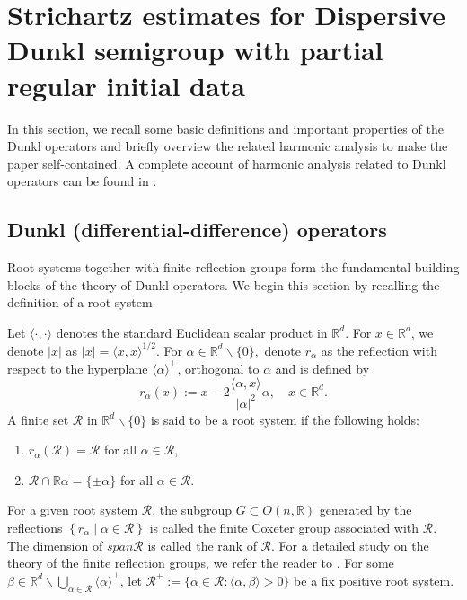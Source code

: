 \documentclass[a4paper,11pt, reqno]{amsart}
\theoremstyle{definition}
\theoremstyle{remark}
\numberwithin{equation}{section}
\begin{document}
	
	
	\section{Strichartz estimates for Dispersive Dunkl semigroup with  partial regular initial data}\label{sec5}
In this section, we recall some basic definitions and important properties of the Dunkl operators and briefly overview the related harmonic analysis to make the paper self-contained. A complete account of harmonic analysis related to Dunkl operators can be found in \cite{ros, ben, Ratna3, Mejjaoli2009, MS, Jiu-Li, FMSW}.  
	\subsection{Dunkl (differential-difference) operators}\label{dunklop} Root systems together with finite reflection groups form the fundamental building blocks of the theory of Dunkl operators. We begin this section by recalling the definition of a root system.
	
	Let $\langle\cdot, \cdot\rangle$  denotes the standard Euclidean scalar product in $\mathbb{R}^{d}$. For $x \in \mathbb{R}^{d}$, we denote   $|x|$ as $|x|=\langle x, x\rangle^{1 / 2}$.
	For $\alpha \in \mathbb{R}^{d} \backslash\{0\},$ denote $r_{\alpha}$ as  the reflection with respect to the hyperplane $\langle \alpha\rangle^{\perp}$, orthogonal to $\alpha$ and is defined by
	$$
	r_{\alpha}(x):=x-2 \frac{\langle \alpha, x\rangle}{|\alpha|^{2}} \alpha, \quad x \in \mathbb{R}^{d}.
	$$
	A finite set $\mathcal{R}$ in $\mathbb{R}^{d} \backslash\{0\}$ is  said to be a  root system if the following holds:
	\begin{enumerate}
		\item $ r_{\alpha}(\mathcal{R})=\mathcal{R}$ for all $\alpha \in \mathcal{R}$,
		\item $\mathcal{R} \cap \mathbb{R} \alpha=\{\pm \alpha\}$ for all $\alpha \in \mathcal{R}$.
	\end{enumerate}
	For a given root system $\mathcal{R}$, the subgroup $G \subset O(n, \mathbb{R})$ generated by the reflections $\left\{r_{\alpha} \mid \alpha \in \mathcal{R}\right\}$ is called the finite Coxeter group associated with $\mathcal{R}$.  The dimension of $span \mathcal{R}$ is called the rank of $\mathcal{R}$.   For a   detailed study on the theory of the   finite reflection groups, we refer the reader to  \cite{hum}.   For some $\beta\in\mathbb{R}^{d}\backslash\bigcup_{\alpha\in\mathcal{R}}\langle \alpha\rangle^{\perp}$, let    $\mathcal{R}^+:=\{\alpha\in\mathcal{R}:\langle\alpha,\beta\rangle>0\}$ be a  fix  positive root system.  
	
\end{document}
